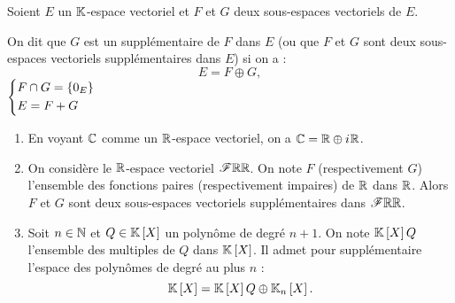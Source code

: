 \begin{defi}[Supplémentaire]
Soient \(E\) un \(\mathbb{K}\)-espace vectoriel et \(F\) et \(G\) deux sous-espaces vectoriels de \(E\).

On dit que \(G\) est un supplémentaire de \(F\) dans \(E\) (ou que \(F\) et \(G\) sont deux sous-espaces vectoriels supplémentaires dans \(E\)) si on a : \[E=F\oplus G,\] \cad \(\begin{dcases}F\cap G=\left\lbrace0_E\right\rbrace \\ E=F+G\end{dcases}\)
\end{defi}

\begin{ex}
\begin{enumerate}
\item En voyant \(\mathbb{C}\) comme un \(\mathbb{R}\)-espace vectoriel, on a \(\mathbb{C}=\mathbb{R}\oplus i\mkern1mu\mathbb{R}\). \\

\item On considère le \(\mathbb{R}\)-espace vectoriel \(\mathscr{F}{\mathbb{R}}{\mathbb{R}}\). On note \(F\) (respectivement \(G\)) l'ensemble des fonctions paires (respectivement impaires) de \(\mathbb{R}\) dans \(\mathbb{R}\). Alors \(F\) et \(G\) sont deux sous-espaces vectoriels supplémentaires dans \(\mathscr{F}{\mathbb{R}}{\mathbb{R}}\). \\

\item Soit \(n\in\mathbb{N}\) et \(Q\in\poly\) un polynôme de degré \(n+1\). On note \(\poly Q\) l'ensemble des multiples de \(Q\) dans \(\poly\). Il admet pour supplémentaire l'espace des polynômes de degré au plus \(n\) : \[\poly=\poly Q\oplus\polydeg{n}.\]
\end{enumerate}
\end{ex}

